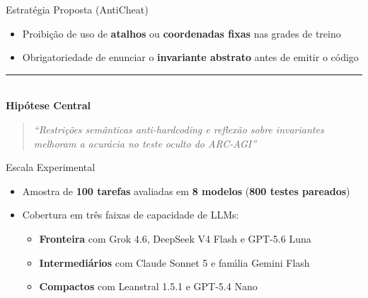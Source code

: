 \documentclass[aspectratio=169, 10pt]{beamer}
\begin{document}
\begin{frame}{Estrat\'{e}gia Proposta (AntiCheat)}
    \vspace{0.6em}
    \begin{itemize}\setlength{\itemsep}{0.9em}
        \item Proibi\c{c}\~{a}o de uso de \textbf{atalhos} ou \textbf{coordenadas fixas} nas grades de treino
        \item Obrigatoriedade de enunciar o \textbf{invariante abstrato} antes de emitir o c\'{o}digo
    \end{itemize}
    \vspace{0.8em}
    \begin{center}
        {\color{mainblue}\rule{0.8\linewidth}{0.5pt}}\\[0.6em]
        \textbf{Hip\'{o}tese Central}
    \end{center}
    \begin{quote}
        \small\centering\itshape
        ``Restri\c{c}\~{o}es sem\^{a}nticas anti-hardcoding e reflex\~{a}o sobre invariantes melhoram a acur\'{a}cia no teste oculto do ARC-AGI''
    \end{quote}
\end{frame}

\begin{frame}{Escala Experimental}
    \vspace{0.8em}
    \begin{itemize}\setlength{\itemsep}{0.9em}
        \item Amostra de \textbf{100 tarefas} avaliadas em \textbf{8 modelos} (\textbf{800 testes pareados})
        \item Cobertura em tr\^{e}s faixas de capacidade de LLMs:
            \begin{itemize}\setlength{\itemsep}{0.3em}
                \item \textbf{Fronteira} com Grok 4.6, DeepSeek V4 Flash e GPT-5.6 Luna
                \item \textbf{Intermedi\'{a}rios} com Claude Sonnet 5 e fam\'{\i}lia Gemini Flash
                \item \textbf{Compactos} com Leanstral 1.5.1 e GPT-5.4 Nano
            \end{itemize}
    \end{itemize}
\end{frame}
\end{document}
